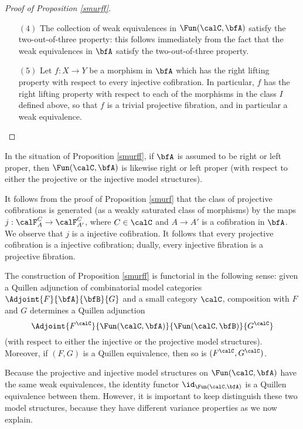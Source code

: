 \begin{proof}[Proof of Proposition \ref{smurff}]
\begin{itemize}
\item[$(4)$] The collection of weak equivalences in $\Fun(\calC, \bfA)$ satisfy the two-out-of-three property: this follows immediately from the fact that the weak equivalences in $\bfA$ satisfy the two-out-of-three property.

\item[$(5)$] Let $f: X \rightarrow Y$ be a morphism in $\bfA$ which has the right lifting property with respect to every injective cofibration. In particular, $f$ has the right lifting property with respect to each of the morphisms in the class $I$ defined above, so that $f$ is a trivial projective fibration, and in particular a weak equivalence.
\end{itemize}
\end{proof}

\begin{remark}\label{postsm}
In the situation of Proposition \ref{smurff}, if $\bfA$ is assumed to be right or left proper, then $\Fun(\calC, \bfA)$ is likewise right or left proper (with respect to either the projective or the injective model structures). 
\end{remark}

\begin{remark}\label{postsmurff}
It follows from the proof of Proposition \ref{smurf} that the class of projective cofibrations
is generated (as a weakly saturated class of morphisms) by the maps $j: \calF^{C}_{A} \rightarrow \calF^{C}_{A'}$, where $C \in \calC$ and $A \rightarrow A'$ is a cofibration in $\bfA$. 
We observe that $j$ is a injective cofibration. It follows that every projective cofibration is a injective cofibration; dually, every injective fibration is a projective fibration.
\end{remark}

\begin{remark}\label{twofus}
The construction of Proposition \ref{smurff} is functorial in the following sense:
given a Quillen adjunction of combinatorial model categories
$\Adjoint{F}{\bfA}{\bfB}{G}$ and
a small category $\calC$, composition with $F$ and $G$ determines a Quillen adjunction
$$ \Adjoint{ F^{\calC}}{\Fun(\calC, \bfA)}{\Fun(\calC, \bfB)}{G^{\calC}}$$
(with respect to either the injective or the projective model structures).
Moreover, if $(F,G)$ is a Quillen equivalence, then so is $( F^{\calC}, G^{\calC} )$.
\end{remark}

Because the projective and injective model structures on
$\Fun(\calC, \bfA)$ have the same weak equivalences, the identity
functor $\id_{\Fun(\calC, \bfA)}$ is a Quillen equivalence between them. However, it is
important to keep distinguish these two model structures, because
they have different variance properties as we now explain.


